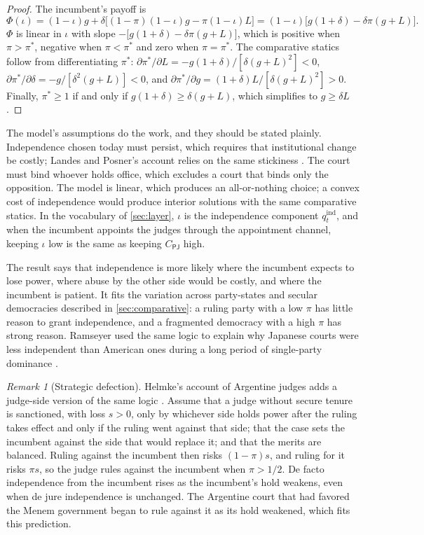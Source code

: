 \documentclass[11pt,letterpaper]{article}
\theoremstyle{definition}
\theoremstyle{remark}
\newtheorem{remark}[theorem]{Remark}
\newcommand{\pP}{\mathsf{P}}
\newcommand{\pJ}{\mathsf{J}}
\begin{document}
\begin{proof}
The incumbent's payoff is
\[
\Phi(\iota)=(1-\iota)g+\delta\big[(1-\pi)(1-\iota)g-\pi(1-\iota)L\big]=(1-\iota)\big[g(1+\delta)-\delta\pi(g+L)\big].
\]
$\Phi$ is linear in $\iota$ with slope $-\big[g(1+\delta)-\delta\pi(g+L)\big]$, which is positive when $\pi>\pi^{*}$, negative when $\pi<\pi^{*}$ and zero when $\pi=\pi^{*}$. The comparative statics follow from differentiating $\pi^{*}$: $\partial\pi^{*}/\partial L=-g(1+\delta)/[\delta(g+L)^2]<0$, $\partial\pi^{*}/\partial\delta=-g/[\delta^{2}(g+L)]<0$, and $\partial\pi^{*}/\partial g=(1+\delta)L/[\delta(g+L)^2]>0$. Finally, $\pi^{*}\ge 1$ if and only if $g(1+\delta)\ge\delta(g+L)$, which simplifies to $g\ge\delta L$.
\end{proof}

The model's assumptions do the work, and they should be stated plainly. Independence chosen today must persist, which requires that institutional change be costly; Landes and Posner's account relies on the same stickiness \citep{landes1975}. The court must bind whoever holds office, which excludes a court that binds only the opposition. The model is linear, which produces an all-or-nothing choice; a convex cost of independence would produce interior solutions with the same comparative statics. In the vocabulary of \cref{sec:layer}, $\iota$ is the independence component $q^{\mathrm{ind}}_t$, and when the incumbent appoints the judges through the appointment channel, keeping $\iota$ low is the same as keeping $C_{\pP\pJ}$ high.

The result says that independence is more likely where the incumbent expects to lose power, where abuse by the other side would be costly, and where the incumbent is patient. It fits the variation across party-states and secular democracies described in \cref{sec:comparative}: a ruling party with a low $\pi$ has little reason to grant independence, and a fragmented democracy with a high $\pi$ has strong reason. Ramseyer used the same logic to explain why Japanese courts were less independent than American ones during a long period of single-party dominance \citep{ramseyer1994}.

\begin{remark}[Strategic defection]
Helmke's account of Argentine judges adds a judge-side version of the same logic \citep{helmke2005}. Assume that a judge without secure tenure is sanctioned, with loss $s>0$, only by whichever side holds power after the ruling takes effect and only if the ruling went against that side; that the case sets the incumbent against the side that would replace it; and that the merits are balanced. Ruling against the incumbent then risks $(1-\pi)s$, and ruling for it risks $\pi s$, so the judge rules against the incumbent when $\pi>1/2$. De facto independence from the incumbent rises as the incumbent's hold weakens, even when de jure independence is unchanged. The Argentine court that had favored the Menem government began to rule against it as its hold weakened, which fits this prediction.
\end{remark}
\end{document}
